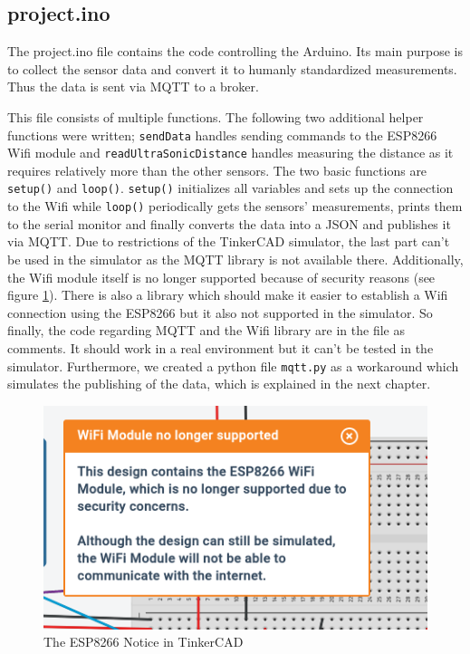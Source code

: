 \documentclass{article}
\begin{document}
\subsection{project.ino}
The project.ino file contains the code controlling the Arduino. Its main purpose is to collect the sensor data and convert it to humanly standardized measurements. Thus the data is sent via MQTT to a broker. \par
This file consists of multiple functions. The following two additional helper functions were written; \texttt{sendData} handles sending commands to the ESP8266 Wifi module and \texttt{readUltraSonicDistance} handles measuring the distance as it requires relatively more than the other sensors. The two basic functions are \texttt{setup()} and \texttt{loop()}. \texttt{setup()} initializes all variables and sets up the connection to the Wifi while \texttt{loop()} periodically gets the sensors' measurements, prints them to the serial monitor and finally converts the data into a JSON and publishes it via MQTT. Due to restrictions of the TinkerCAD simulator, the last part can't be used in the simulator as the MQTT library is not available there. Additionally, the Wifi module itself is no longer supported because of security reasons (see figure \ref{fig:security}). There is also a library which should make it easier to establish a Wifi connection using the ESP8266 but it also not supported in the simulator. So finally, the code regarding MQTT and the Wifi library are in the file as comments. It should work in a real environment but it can't be tested in the simulator. Furthermore, we created a python file \texttt{mqtt.py} as a workaround which simulates the publishing of the data, which is explained in the next chapter.\par
\begin{figure}
\centering
\includegraphics[scale=0.4]{security.png}
\caption{The ESP8266 Notice in TinkerCAD}
\label{fig:security}
\end{figure}
\end{document}
